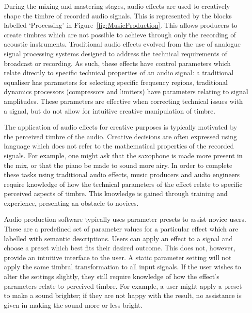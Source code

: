 	During the mixing and mastering stages, audio effects are used to creatively shape the timbre of recorded audio
	signals. This is represented by the blocks labelled `Processing' in Figure~\ref{fig:MusicProduction}. This allows
	producers to create timbres which are not possible to achieve through only the recording of acoustic instruments.
	Traditional audio effects evolved from the use of analogue signal processing systems designed to address the
	technical requirements of broadcast or recording. As such, these effects have control parameters which relate
	directly to specific technical properties of an audio signal: a traditional equaliser has parameters for selecting
	specific frequency regions, traditional dynamics processors (compressors and limiters) have parameters relating to
	signal amplitudes. These parameters are effective when correcting technical issues with a signal, but do not allow
	for intuitive creative manipulation of timbre.

	The application of audio effects for creative purposes is typically motivated by the perceived timbre of the audio.
	Creative decisions are often expressed using language which does not refer to the mathematical properties of the
	recorded signals. For example, one might ask that the saxophone is made more present in the mix, or that the piano
	be made to sound more airy. In order to complete these tasks using traditional audio effects, music producers and
	audio engineers require knowledge of how the technical parameters of the effect relate to specific perceived aspects
	of timbre. This knowledge is gained through training and experience, presenting an obstacle to novices.

	Audio production software typically uses parameter presets to assist novice users. These are a predefined set of
	parameter values for a particular effect which are labelled with semantic descriptions. Users can apply an effect to
	a signal and choose a preset which best fits their desired outcome. This does not, however, provide an intuitive
	interface to the user. A static parameter setting will not apply the same timbral transformation to all input
	signals. If the user wishes to alter the settings slightly, they still require knowledge of how the effect's
	parameters relate to perceived timbre. For example, a user might apply a preset to make a sound brighter; if they
	are not happy with the result, no assistance is given in making the sound more or less bright.

